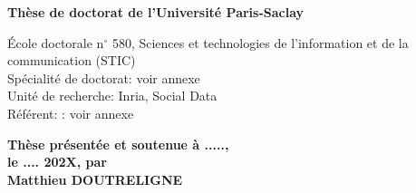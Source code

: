 \documentclass[french,12pt,twoside,a4paper]{book}
\begin{document}
\begin{titlepage}
  \textbf{Thèse de doctorat de l'Université Paris-Saclay}


  \vspace{15mm}

  École doctorale n$^{\circ}$  580,
  Sciences et technologies de l'information et de la communication (STIC)\\
  \small Spécialité de doctorat: voir annexe\\
  \footnotesize Unité de recherche: Inria, Social Data\\
  \footnotesize Référent: : voir annexe
  \vspace{15mm}

  \textbf{Thèse présentée et soutenue à .....,\\ le .... 202X, par}\\
  \bigskip
  \Large {\color{Prune} \textbf{Matthieu DOUTRELIGNE}}


  \vspace{\fill} %

  \bigskip

  \flushleft


\end{titlepage}
\end{document}
